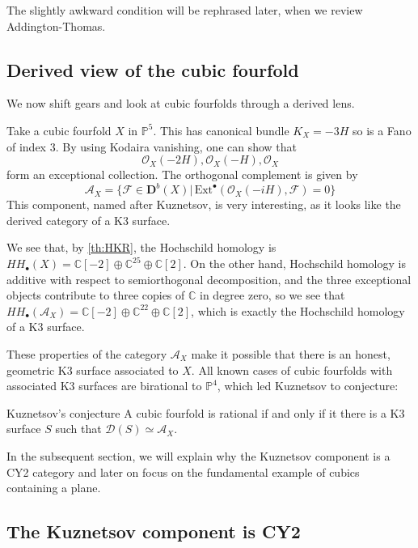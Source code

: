 The slightly awkward condition will be rephrased later, when we review Addington-Thomas.

\subsection{Derived view of the cubic fourfold}

We now shift gears and look at cubic fourfolds through a derived lens.

Take a cubic fourfold $X$ in $\mathbb{P}^5$. This has canonical bundle $K_{X}=-3H$ so is a Fano of index 3. By using Kodaira vanishing, one can show that $$\mathcal{O}_{X}(-2H), \mathcal{O}_{X}(-H), \mathcal{O}_{X}$$form an exceptional collection. The orthogonal complement is given by $$\mathcal{A}_{X}=\{\mathcal{F}\in \mathbf{D}^b(X)|\,\mathrm{Ext}^\bullet(\mathcal{O}_{X}(-iH), \mathcal{F})=0\}$$This component, named after Kuznetsov, is very interesting, as it looks like the derived category of a K3 surface.

We see that, by \ref{th:HKR}, the Hochschild homology is $HH_\bullet(X)=\mathbb{C}[-2]\oplus \mathbb{C}^{25}\oplus \mathbb{C}[2]$. On the other hand, Hochschild homology is additive with respect to semiorthogonal decomposition, and the three exceptional objects contribute to three copies of $\mathbb{C}$ in degree zero, so we see that $HH_\bullet(\mathcal{A}_X)=\mathbb{C}[-2]\oplus \mathbb{C}^{22}\oplus \mathbb{C}[2]$, which is exactly the Hochschild homology of a K3 surface.

These properties of the category $\mathcal{A}_X$ make it possible that there is an honest, geometric K3 surface associated to $X$. All known cases of cubic fourfolds with associated K3 surfaces are birational to $\mathbb{P}^4$, which led Kuznetsov to conjecture:

\begin{conjecture}{}{Kuznetsov's conjecture}
A cubic fourfold is rational if and only if it there is a K3 surface $S$ such that $\mathcal{D}(S)\simeq \mathcal{A}_X$.
\end{conjecture}

In the subsequent section, we will explain why the Kuznetsov component is a CY2 category and later on focus on the fundamental example of cubics containing a plane.

\subsection{The Kuznetsov component is CY2}

